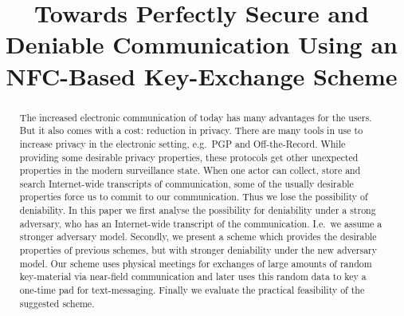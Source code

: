\title{%
  Towards Perfectly Secure and Deniable Communication Using an NFC-Based 
  Key-Exchange Scheme
}

\maketitle
\begin{abstract}
  The increased electronic communication of today has many advantages for the 
  users.
  But it also comes with a cost: reduction in privacy.
  There are many tools in use to increase privacy in the electronic setting, 
  e.g.~PGP and Off-the-Record.
  While providing some desirable privacy properties, these protocols get other 
  unexpected properties in the modern surveillance state.
  When one actor can collect, store and search Internet-wide transcripts of 
  communication, some of the usually desirable properties force us to commit to 
  our communication.
  Thus we lose the possibility of deniability.
  In this paper we first analyse the possibility for deniability under a strong 
  adversary, who has an Internet-wide transcript of the communication.
  I.e.~we assume a stronger adversary model.
  Secondly, we present a scheme which provides the desirable properties of 
  previous schemes, but with stronger deniability under the new adversary 
  model.
  Our scheme uses physical meetings for exchanges of large amounts of random 
  key-material via near-field communication and later uses this random data to 
  key a one-time pad for text-messaging.
  Finally we evaluate the practical feasibility of the suggested scheme.

\end{abstract}


